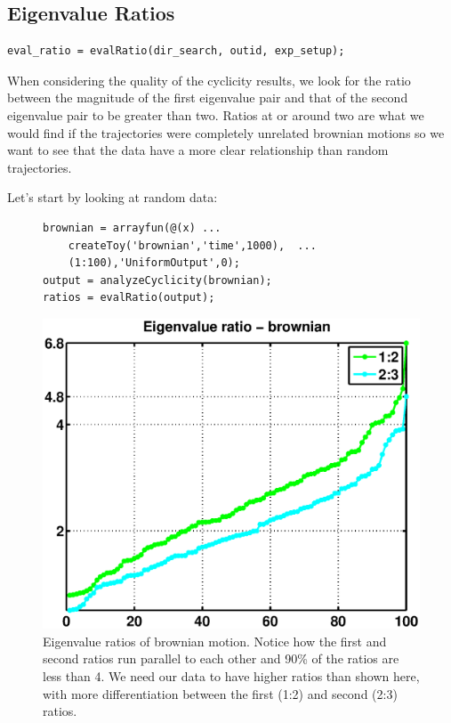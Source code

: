 \documentclass[11pt]{article}
\begin{document}
\subsection{Eigenvalue Ratios}

\begin{lstlisting}[frame=single]
eval_ratio = evalRatio(dir_search, outid, exp_setup);
\end{lstlisting}

When considering the quality of the cyclicity results, we look for the ratio between the magnitude of the first eigenvalue pair and that of the second eigenvalue pair to be greater than two. Ratios at or around two are what we would find if the trajectories were completely unrelated brownian motions so we want to see that the data have a more clear relationship than random trajectories.

Let's start by looking at random data:

\begin{figure}[H]
\begin{minipage}{.6\linewidth}
\begin{lstlisting}
brownian = arrayfun(@(x) ...
	createToy('brownian','time',1000),	...
	(1:100),'UniformOutput',0);
output = analyzeCyclicity(brownian);
ratios = evalRatio(output);
\end{lstlisting}
\end{minipage}
\hfill
\begin{minipage}{.39\linewidth}
\includegraphics[width=\linewidth]{figs/brownian_evalRatio.eps}
\end{minipage}
\caption{Eigenvalue ratios of brownian motion. Notice how the first and second ratios run parallel to each other and 90\% of the ratios are less than 4. We need our data to have higher ratios than shown here, with more differentiation between the first (1:2) and second (2:3) ratios.}
\label{fig:brownian}
\end{figure}
\end{document}
